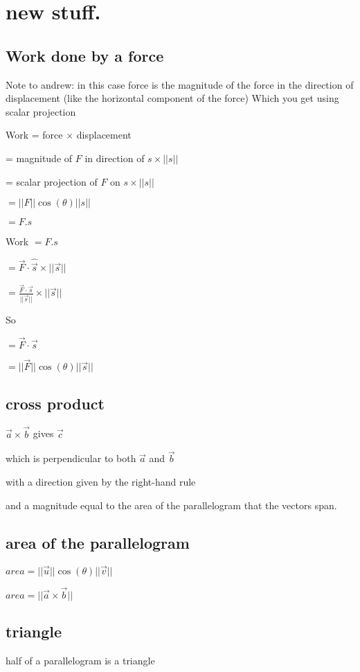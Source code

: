 \documentclass{extarticle}
\begin{document}
\section{new stuff.}

\subsection{Work done by a force}


Note to andrew: in this case force is the magnitude of the force in the direction of displacement (like the horizontal component of the force) Which you get using scalar projection


Work = force $\times$ displacement

= magnitude of $F$ in direction of $s \times ||s||$

= scalar projection of $F$ on $s \times ||s||$

$= ||F||\cos{(\theta)}||s||$

$= F.s$

Work $= F.s$


$=\vec{F} \cdot \hat{\vec{s}} \times ||\vec{s}||$

$=\frac{\vec{F} \cdot \vec{s}}{||\vec{s}||} \times ||\vec{s}||$

So

$=\vec{F} \cdot \vec{s}$

$= ||\vec{F}||\cos(\theta)||\vec{s}||$


\subsection{cross product}
$\vec{a}\times \vec{b}$ gives $\vec{c}$

which is perpendicular to both $\vec{a}$ and $\vec{b}$

with a direction given by the right-hand rule

and a magnitude equal to the area of the parallelogram that the vectors span.

\subsection{area of the parallelogram}
$area =||\vec{u}||\cos{(\theta)}||\vec{v}||$

$area =||\vec{a}\times \vec{b}||$
\subsection{triangle}
half of a parallelogram is a triangle
\end{document}
